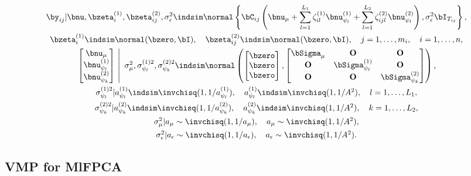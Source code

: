 \documentclass[ba]{imsart}
\numberwithin{equation}{section}
\theoremstyle{plain}
\def\sigsqeps{\sigma^2_{\epsilon}}
\def\aeps{a_{\epsilon}}
\def\sigsqmu{\sigma^2_{\mu}}
\def\amu{a_{\mu}}
\def\numu{\bnu_\mu}
\newcommand\zetaL[2]{\zeta^{(#1)}_{#2}}
\newcommand\bzetaL[2]{\bzeta^{(#1)}_{#2}}
\newcommand\nupsiL[2]{\bnu^{(#1)}_{\psi_{#2}}}
\newcommand\sigsqpsiL[2]{\sigma^{(#1) 2}_{\psi_{#2}}}
\newcommand\apsiL[2]{a^{(#1)}_{\psi_{#2}}}
\begin{document}
\begin{equation}
\begin{gathered}
	\by_{ij} | \bnu, \bzetaL{1}{i}, \bzetaL{2}{ij}, \sigsqeps \indsim \normal \left\{
		\bC_{ij} \left(
			\numu + \sum_{l=1}^{L_1} \zetaL{1}{il} \nupsiL{1}{l}
			+ \sum_{l=1}^{L_2} \zetaL{2}{ijl} \nupsiL{2}{l}
		\right),
		\sigsqeps \bI_{T_{ij}}
	\right\}, \\
	$$
	\bzetaL{1}{i} \indsim \normal (\bzero, \bI), \quad
	\bzetaL{2}{ij} \indsim \normal (\bzero, \bI), \quad
	j = 1, \dots, m_i, \quad i = 1, \dots, n, \\
	$$
	\left.\begin{bmatrix}
		\numu \\
		\nupsiL{1}{l} \\
		\nupsiL{2}{k}
	\end{bmatrix} \ \right| \ \sigsqmu, \sigsqpsiL{1}{l}, \sigsqpsiL{2}{k}
		\indsim
			\normal \left(
				\begin{bmatrix}
					\bzero \\
					\bzero \\
					\bzero
				\end{bmatrix},
				\begin{bmatrix}
					\bSigma_\mu & \textbf{O} & \textbf{O} \\
					\textbf{O} & \bSigma^{(1)}_{\psi_l} & \textbf{O} \\
					\textbf{O} & \textbf{O} & \bSigma^{(2)}_{\psi_k}
				\end{bmatrix}
			\right), \\
	$$
	\sigsqpsiL{1}{l} | \apsiL{1}{l} \indsim \invchisq (1, 1/\apsiL{1}{l}), \quad
	\apsiL{1}{l} \indsim \invchisq (1, 1/A^2), \quad l = 1, \dots, L_1, \\
	$$
	\sigsqpsiL{2}{k} | \apsiL{2}{k} \indsim \invchisq (1, 1/\apsiL{2}{k}), \quad
	\apsiL{2}{k} \indsim \invchisq (1, 1/A^2), \quad k = 1, \dots, L_2, \\
	$$
	\sigsqmu | \amu \sim \invchisq (1, 1/\amu), \quad \amu \sim \invchisq(1, 1/A^2), \\
	$$
	\sigsqeps | \aeps \sim \invchisq (1, 1/\aeps), \quad \aeps \sim \invchisq(1, 1/A^2).
\end{gathered}
\label{bayes_mlfpca_mod}
\end{equation}


\subsection{VMP for MlFPCA}
\label{sec:vmp_mlfpca}
\end{document}
